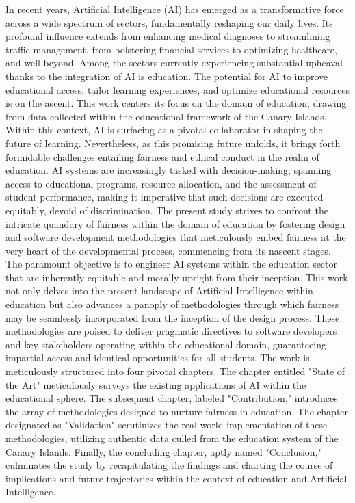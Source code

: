 In recent years, Artificial Intelligence (AI) has emerged as a transformative force across a wide spectrum of sectors, fundamentally reshaping our daily lives. Its profound influence extends from enhancing medical diagnoses to streamlining traffic management, from bolstering financial services to optimizing healthcare, and well beyond. Among the sectors currently experiencing substantial upheaval thanks to the integration of AI is education. The potential for AI to improve educational access, tailor learning experiences, and optimize educational resources is on the ascent.
This work centers its focus on the domain of education, drawing from data collected within the educational framework of the Canary Islands. Within this context, AI is surfacing as a pivotal collaborator in shaping the future of learning. Nevertheless, as this promising future unfolds, it brings forth formidable challenges entailing fairness and ethical conduct in the realm of education. AI systems are increasingly tasked with decision-making, spanning access to educational programs, resource allocation, and the assessment of student performance, making it imperative that such decisions are executed equitably, devoid of discrimination.
The present study strives to confront the intricate quandary of fairness within the domain of education by fostering design and software development methodologies that meticulously embed fairness at the very heart of the developmental process, commencing from its nascent stages. The paramount objective is to engineer AI systems within the education sector that are inherently equitable and morally upright from their inception.
This work not only delves into the present landscape of Artificial Intelligence within education but also advances a panoply of methodologies through which fairness may be seamlessly incorporated from the inception of the design process. These methodologies are poised to deliver pragmatic directives to software developers and key stakeholders operating within the educational domain, guaranteeing impartial access and identical opportunities for all students.
The work is meticulously structured into four pivotal chapters. The chapter entitled "State of the Art" meticulously surveys the existing applications of AI within the educational sphere. The subsequent chapter, labeled "Contribution," introduces the array of methodologies designed to nurture fairness in education. The chapter designated as "Validation" scrutinizes the real-world implementation of these methodologies, utilizing authentic data culled from the education system of the Canary Islands. Finally, the concluding chapter, aptly named "Conclusion," culminates the study by recapitulating the findings and charting the course of implications and future trajectories within the context of education and Artificial Intelligence.
